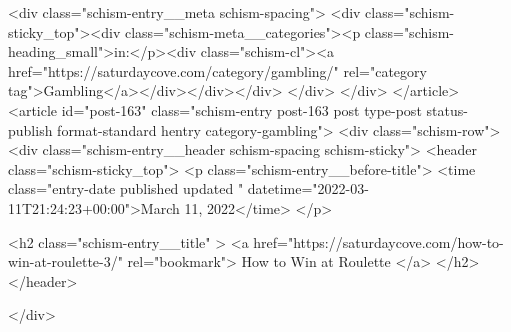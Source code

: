 {		<div class="schism-entry__meta schism-spacing">			<div class="schism-sticky_top"><div class="schism-meta__categories"><p class="schism-heading_small">in:</p><div class="schism-cl"><a href="https://saturdaycove.com/category/gambling/" rel="category tag">Gambling</a></div></div></div>		</div>
	</div>
</article>
<article id="post-163" class="schism-entry post-163 post type-post status-publish format-standard hentry category-gambling">
	<div class="schism-row">		<div class="schism-entry__header schism-spacing schism-sticky">			<header class="schism-sticky_top">				<p class="schism-entry__before-title">
					<time class="entry-date published updated " datetime="2022-03-11T21:24:23+00:00">March 11, 2022</time>				</p>

				<h2 class="schism-entry__title" >
					<a href="https://saturdaycove.com/how-to-win-at-roulette-3/" rel="bookmark">
						How to Win at Roulette					</a>
				</h2>
			</header>

					</div>

}

